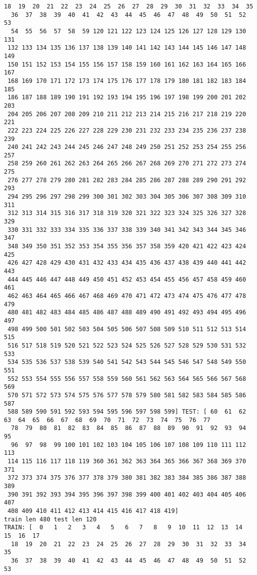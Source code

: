 \documentclass[11pt]{article}
\begin{document}
\begin{Verbatim}[commandchars=\\\{\}]
  18  19  20  21  22  23  24  25  26  27  28  29  30  31  32  33  34  35
  36  37  38  39  40  41  42  43  44  45  46  47  48  49  50  51  52  53
  54  55  56  57  58  59 120 121 122 123 124 125 126 127 128 129 130 131
 132 133 134 135 136 137 138 139 140 141 142 143 144 145 146 147 148 149
 150 151 152 153 154 155 156 157 158 159 160 161 162 163 164 165 166 167
 168 169 170 171 172 173 174 175 176 177 178 179 180 181 182 183 184 185
 186 187 188 189 190 191 192 193 194 195 196 197 198 199 200 201 202 203
 204 205 206 207 208 209 210 211 212 213 214 215 216 217 218 219 220 221
 222 223 224 225 226 227 228 229 230 231 232 233 234 235 236 237 238 239
 240 241 242 243 244 245 246 247 248 249 250 251 252 253 254 255 256 257
 258 259 260 261 262 263 264 265 266 267 268 269 270 271 272 273 274 275
 276 277 278 279 280 281 282 283 284 285 286 287 288 289 290 291 292 293
 294 295 296 297 298 299 300 301 302 303 304 305 306 307 308 309 310 311
 312 313 314 315 316 317 318 319 320 321 322 323 324 325 326 327 328 329
 330 331 332 333 334 335 336 337 338 339 340 341 342 343 344 345 346 347
 348 349 350 351 352 353 354 355 356 357 358 359 420 421 422 423 424 425
 426 427 428 429 430 431 432 433 434 435 436 437 438 439 440 441 442 443
 444 445 446 447 448 449 450 451 452 453 454 455 456 457 458 459 460 461
 462 463 464 465 466 467 468 469 470 471 472 473 474 475 476 477 478 479
 480 481 482 483 484 485 486 487 488 489 490 491 492 493 494 495 496 497
 498 499 500 501 502 503 504 505 506 507 508 509 510 511 512 513 514 515
 516 517 518 519 520 521 522 523 524 525 526 527 528 529 530 531 532 533
 534 535 536 537 538 539 540 541 542 543 544 545 546 547 548 549 550 551
 552 553 554 555 556 557 558 559 560 561 562 563 564 565 566 567 568 569
 570 571 572 573 574 575 576 577 578 579 580 581 582 583 584 585 586 587
 588 589 590 591 592 593 594 595 596 597 598 599] TEST: [ 60  61  62  63  64  65  66  67  68  69  70  71  72  73  74  75  76  77
  78  79  80  81  82  83  84  85  86  87  88  89  90  91  92  93  94  95
  96  97  98  99 100 101 102 103 104 105 106 107 108 109 110 111 112 113
 114 115 116 117 118 119 360 361 362 363 364 365 366 367 368 369 370 371
 372 373 374 375 376 377 378 379 380 381 382 383 384 385 386 387 388 389
 390 391 392 393 394 395 396 397 398 399 400 401 402 403 404 405 406 407
 408 409 410 411 412 413 414 415 416 417 418 419]
train len 480 test len 120
TRAIN: [  0   1   2   3   4   5   6   7   8   9  10  11  12  13  14  15  16  17
  18  19  20  21  22  23  24  25  26  27  28  29  30  31  32  33  34  35
  36  37  38  39  40  41  42  43  44  45  46  47  48  49  50  51  52  53

\end{Verbatim}
\end{document}
